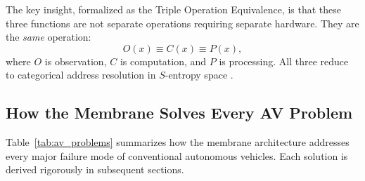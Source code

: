 \documentclass[twocolumn,10pt]{article}
\theoremstyle{definition}
\theoremstyle{remark}
\begin{document}
The key insight, formalized as the Triple Operation Equivalence, is that these three functions are not separate operations requiring separate hardware. They are the \emph{same} operation:
\begin{equation}
  O(x) \equiv C(x) \equiv P(x),
  \label{eq:triple_operation}
\end{equation}
where $O$ is observation, $C$ is computation, and $P$ is processing. All three reduce to categorical address resolution in $S$-entropy space \cite{sachikonye2026partition, sachikonye2026single}.

\subsection{How the Membrane Solves Every AV Problem}

Table~\ref{tab:av_problems} summarizes how the membrane architecture addresses every major failure mode of conventional autonomous vehicles. Each solution is derived rigorously in subsequent sections.
\end{document}
